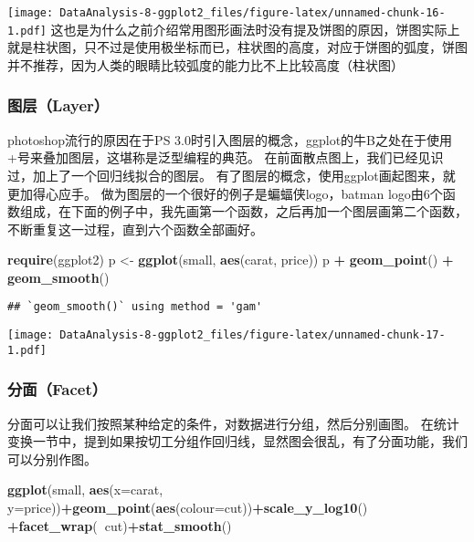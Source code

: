 \documentclass[]{article}
\newenvironment{Shaded}{\begin{snugshade}}{\end{snugshade}}
\newcommand{\KeywordTok}[1]{\textcolor[rgb]{0.13,0.29,0.53}{\textbf{#1}}}
\newcommand{\DataTypeTok}[1]{\textcolor[rgb]{0.13,0.29,0.53}{#1}}
\newcommand{\StringTok}[1]{\textcolor[rgb]{0.31,0.60,0.02}{#1}}
\newcommand{\OperatorTok}[1]{\textcolor[rgb]{0.81,0.36,0.00}{\textbf{#1}}}
\newcommand{\NormalTok}[1]{#1}
\begin{document}
\texttt{[image: DataAnalysis-8-ggplot2\_files/figure-latex/unnamed-chunk-16-1.pdf]}
这也是为什么之前介绍常用图形画法时没有提及饼图的原因，饼图实际上就是柱状图，只不过是使用极坐标而已，柱状图的高度，对应于饼图的弧度，饼图并不推荐，因为人类的眼睛比较弧度的能力比不上比较高度（柱状图）

\subsubsection{图层（Layer）}\label{layer}

photoshop流行的原因在于PS
3.0时引入图层的概念，ggplot的牛B之处在于使用+号来叠加图层，这堪称是泛型编程的典范。
在前面散点图上，我们已经见识过，加上了一个回归线拟合的图层。
有了图层的概念，使用ggplot画起图来，就更加得心应手。
做为图层的一个很好的例子是蝙蝠侠logo，batman
logo由6个函数组成，在下面的例子中，我先画第一个函数，之后再加一个图层画第二个函数，不断重复这一过程，直到六个函数全部画好。

\begin{Shaded}
\begin{Highlighting}[]
\KeywordTok{require}\NormalTok{(ggplot2)}
\NormalTok{p <-}\StringTok{ }\KeywordTok{ggplot}\NormalTok{(small, }\KeywordTok{aes}\NormalTok{(carat, price))}
\NormalTok{p }\OperatorTok{+}\StringTok{ }\KeywordTok{geom_point}\NormalTok{() }\OperatorTok{+}\StringTok{ }\KeywordTok{geom_smooth}\NormalTok{()}
\end{Highlighting}
\end{Shaded}

\begin{verbatim}
## `geom_smooth()` using method = 'gam'
\end{verbatim}

\texttt{[image: DataAnalysis-8-ggplot2\_files/figure-latex/unnamed-chunk-17-1.pdf]}

\subsubsection{分面（Facet）}\label{facet}

分面可以让我们按照某种给定的条件，对数据进行分组，然后分别画图。
在统计变换一节中，提到如果按切工分组作回归线，显然图会很乱，有了分面功能，我们可以分别作图。

\begin{Shaded}
\begin{Highlighting}[]
\KeywordTok{ggplot}\NormalTok{(small, }\KeywordTok{aes}\NormalTok{(}\DataTypeTok{x=}\NormalTok{carat, }\DataTypeTok{y=}\NormalTok{price))}\OperatorTok{+}\KeywordTok{geom_point}\NormalTok{(}\KeywordTok{aes}\NormalTok{(}\DataTypeTok{colour=}\NormalTok{cut))}\OperatorTok{+}\KeywordTok{scale_y_log10}\NormalTok{() }\OperatorTok{+}\KeywordTok{facet_wrap}\NormalTok{(}\OperatorTok{~}\NormalTok{cut)}\OperatorTok{+}\KeywordTok{stat_smooth}\NormalTok{()}
\end{Highlighting}
\end{Shaded}
\end{document}
